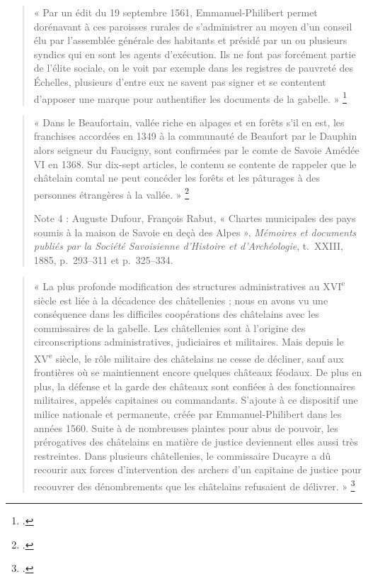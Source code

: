 \documentclass[12pt,a4paper]{report}
\begin{document}
\begin{itemize}
	\begin{quote}
	« Par un édit du 19 septembre 1561, Emmanuel-Philibert permet dorénavant à ces paroisses rurales de s’administrer au moyen d’un conseil élu par l’assemblée générale des habitants et présidé par un ou plusieurs syndics qui en sont les agents d’exécution. Ils ne font pas forcément partie de l’élite sociale, on le voit par exemple dans les registres de pauvreté des Échelles, plusieurs d’entre eux ne savent pas signer et se contentent d’apposer une marque pour authentifier les documents de la gabelle. »
	\footcite[139]{Gachet2011GabelleSel1561}
\end{quote} 


\begin{quote}
	« Dans le Beaufortain, vallée riche en alpages et en forêts s’il en est, les franchises accordées en 1349 à la communauté de Beaufort par le Dauphin alors seigneur du Faucigny, sont confirmées par le comte de Savoie Amédée VI en 1368. Sur dix-sept articles, le contenu se contente de rappeler que le châtelain comtal ne peut concéder les forêts et les pâturages à des personnes étrangères à la vallée. »
	\footcite[65]{Mouthon2016}
	
	\footnotesize
	Note 4 : Auguste Dufour, François Rabut, « Chartes municipales des pays soumis à la maison de Savoie en deçà des Alpes », \textit{Mémoires et documents publiés par la Société Savoisienne d’Histoire et d’Archéologie}, t.~XXIII, 1885, p.~293--311 et p.~325--334.
\end{quote}


\begin{quote}
	« La plus profonde modification des structures administratives au XVI\textsuperscript{e} siècle est liée à la décadence des châtellenies ; nous en avons vu une conséquence dans les difficiles coopérations des châtelains avec les commissaires de la gabelle. Les châtellenies sont à l’origine des circonscriptions administratives, judiciaires et militaires. Mais depuis le XV\textsuperscript{e} siècle, le rôle militaire des châtelains ne cesse de décliner, sauf aux frontières où se maintiennent encore quelques châteaux féodaux. De plus en plus, la défense et la garde des châteaux sont confiées à des fonctionnaires militaires, appelés capitaines ou commandants. S’ajoute à ce dispositif une milice nationale et permanente, créée par Emmanuel-Philibert dans les années 1560. Suite à de nombreuses plaintes pour abus de pouvoir, les prérogatives des châtelains en matière de justice deviennent elles aussi très restreintes. Dans plusieurs châtellenies, le commissaire Ducayre a dû recourir aux forces d’intervention des archers d’un capitaine de justice pour recouvrer des dénombrements que les châtelains refusaient de délivrer. »
	\footcite[138]{Gachet2011GabelleSel1561}
\end{quote}



\end{itemize}
\end{document}
